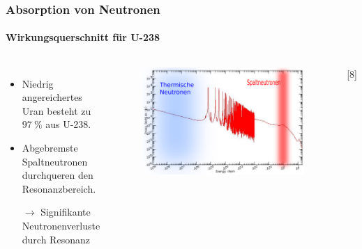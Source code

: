 \documentclass{beamer}[9pt]
\begin{document}
\begin{frame}
\frametitle{Absorption von Neutronen}
\framesubtitle{Wirkungsquerschnitt für U-238}
\begin{columns}

\begin{itemize}
\item Niedrig angereichertes Uran besteht zu $\SI{97}{\percent}$ aus U-238.
\item Abgebremste Spaltneutronen durchqueren den Resonanzbereich.
\item [$\rightarrow$] Signifikante Neutronenverluste durch Resonanz
\end{itemize}


\begin{figure}
\includegraphics[scale=0.3]{u238_absorption_cs.pdf}
\end{figure}
\hspace{.5\columnwidth}[8]
\end{columns}
\end{frame}
\end{document}
